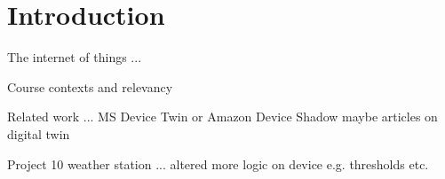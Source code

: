 \section{Introduction}

The internet of things ...

Course contexts and relevancy

Related work ...  MS Device Twin or Amazon Device Shadow maybe articles on digital twin 

Project 10 weather station ... altered more logic on device e.g. thresholds etc.

\pagebreak